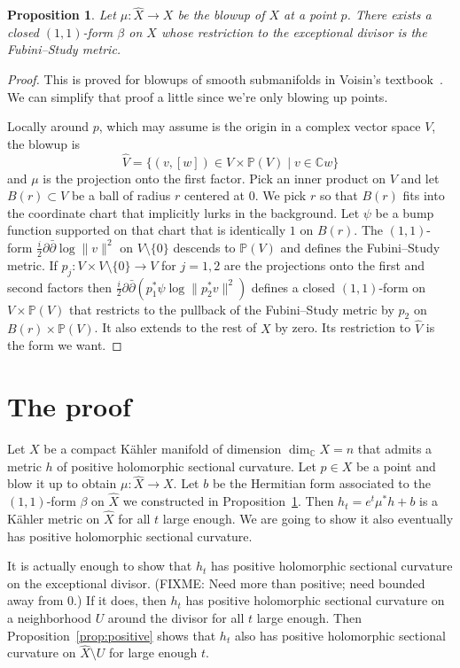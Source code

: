 \documentclass[10pt,a4paper]{amsart}
\newtheorem{prop}[theo]{Proposition}
\newcommand{\kk}[1]{\mathbb{#1}}
\def\hsc{holomorphic sectional curvature}
\def\bl#1{\widehat{#1}}
\begin{document}
\begin{prop}
\label{prop:fs}
Let $\mu : \bl X \to X$ be the blowup of $X$ at a point $p$.
There exists a closed $(1,1)$-form $\beta$ on $X$ whose restriction to
the exceptional divisor is the Fubini--Study metric.
\end{prop}

\begin{proof}
This is proved for blowups of smooth submanifolds in
Voisin's textbook~\cite{voisin2002theorie}. We can simplify that proof a little
since we're only blowing up points.

Locally around $p$, which may assume is the origin in a complex vector space
$V$, the blowup is
$$
\bl V
= \{ (v,[w]) \in V \times \kk P(V) \mid v \in \kk C w \}
$$
and $\mu$ is the projection onto the first factor.
Pick an inner product on $V$ and let $B(r) \subset V$ be a ball of radius $r$
centered at $0$.
We pick $r$ so that $B(r)$ fits into the coordinate chart that implicitly lurks
in the background.
Let $\psi$ be a bump function supported on that chart that is identically $1$
on $B(r)$.
The $(1,1)$-form $\frac i2 \partial\bar\partial \log \|v\|^2$ on $V \setminus
\{0\}$ descends to $\kk P(V)$ and defines the Fubini--Study metric.
If $p_j : V \times V \setminus \{0\} \to V$ for $j = 1,2$ are the projections
onto the first and second factors then
$\frac i2 \partial \bar\partial (p_1^*\psi \log \|p_2^*v\|^2)$
defines a closed $(1,1)$-form on $V \times \kk P(V)$ that restricts to the
pullback of the Fubini--Study metric by $p_2$ on $B(r) \times \kk P(V)$.
It also extends to the rest of $X$ by zero.
Its restriction to $\bl V$ is the form we want.
\end{proof}



\section{The proof}

Let $X$ be a compact K\"ahler manifold of dimension $\dim_{\kk C} X = n$ that
admits a metric $h$ of positive \hsc.
Let $p \in X$ be a point and blow it up to obtain $\mu : \bl X \to X$.
Let $b$ be the Hermitian form associated to the $(1,1)$-form $\beta$ on $\bl X$
we constructed in Proposition~\ref{prop:fs}.
Then $h_t = e^t \mu^*h + b$ is a K\"ahler metric on $\bl X$ for all $t$ large
enough.
We are going to show it also eventually has positive \hsc.

It is actually enough to show that $h_t$ has positive \hsc{} on the exceptional
divisor.
(FIXME: Need more than positive; need bounded away from $0$.)
If it does, then $h_t$ has positive \hsc{} on a neighborhood $U$ around the
divisor for all $t$ large enough.
Then Proposition~\ref{prop:positive} shows that $h_t$ also has positive \hsc{}
on $\bl X \setminus U$ for large enough $t$.
\end{document}
